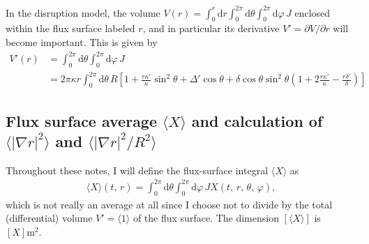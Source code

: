 \documentclass[11pt,a4paper]{article}
\newcommand{\rd}{\ensuremath{\mathrm{d}}}
\begin{document}
In the disruption model, the volume $V(r) = \int_0^r \rd r \int_0^{2\pi}\rd \theta \int_0^{2\pi} \rd \varphi \, J $ enclosed within the flux surface labeled $r$, and in particular its derivative $V' = \partial V/\partial r$ will become important. This is given by
\begin{align}
V'(r) &= \int_0^{2\pi}\rd \theta \int_0^{2\pi} \rd \varphi \, J \nonumber \\
&= 2\pi \kappa r  \int_0^{2\pi}\rd \theta  \,R\left[ 1+\frac{r\kappa'}{\kappa}\sin^2 \theta + \Delta'\cos\theta + \delta\cos\theta\sin^2\theta \left(1+2\frac{r\kappa'}{\kappa} - \frac{r\delta'}{\delta}\right)\right] %
\end{align}

\subsection{Flux surface average $\langle X \rangle$ and calculation of $\langle |\nabla r|^2 \rangle$ and $\langle |\nabla r |^2 / R^2 \rangle$}
Throughout these notes, I will define the flux-surface integral $\langle X \rangle$ as 
\begin{align}
\langle X \rangle(t,\,r) = \int_0^{2\pi}\rd \theta \int_0^{2\pi} \rd \varphi \, J X(t,\,r,\,\theta,\,\varphi),
\end{align}
which is not really an average at all since I choose not to divide by the total (differential) volume $V' = \langle 1 \rangle$ of the flux surface. The dimension $[\langle X \rangle]$ is $[X]\text{m}^2$.
\end{document}
